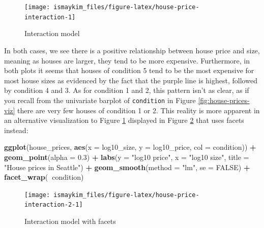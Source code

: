 \documentclass[12pt, krantz2,]{krantz}
\makeatletter
\newenvironment{Shaded}{\begin{snugshade}}{\end{snugshade}}
\newcommand{\DataTypeTok}[1]{\textcolor[rgb]{0.27,0.27,0.27}{#1}}
\newcommand{\FloatTok}[1]{\textcolor[rgb]{0.06,0.06,0.06}{#1}}
\newcommand{\KeywordTok}[1]{\textcolor[rgb]{0.27,0.27,0.27}{\textbf{#1}}}
\newcommand{\NormalTok}[1]{#1}
\newcommand{\OperatorTok}[1]{\textcolor[rgb]{0.43,0.43,0.43}{\textbf{#1}}}
\newcommand{\OtherTok}[1]{\textcolor[rgb]{0.37,0.37,0.37}{#1}}
\newcommand{\StringTok}[1]{\textcolor[rgb]{0.5,0.5,0.5}{#1}}
\newenvironment{kframe}{%
\medskip{}
\setlength{\fboxsep}{.8em}
 \def\at@end@of@kframe{}%
 \ifinner\ifhmode%
  \def\at@end@of@kframe{\end{minipage}}%
  \begin{minipage}{\columnwidth}%
 \fi\fi%
 \def\FrameCommand##1{\hskip\@totalleftmargin \hskip-\fboxsep
 \colorbox{shadecolor}{##1}\hskip-\fboxsep
     \hskip-\linewidth \hskip-\@totalleftmargin \hskip\columnwidth}%
 \MakeFramed {\advance\hsize-\width
   \@totalleftmargin\z@ \linewidth\hsize
   \@setminipage}}%
 {\par\unskip\endMakeFramed%
 \at@end@of@kframe}
\renewenvironment{Shaded}{\begin{kframe}}{\end{kframe}}
\makeatother
\begin{document}
\begin{figure}

{\centering \texttt{[image: ismaykim\_files/figure-latex/house-price-interaction-1]} 

}

\caption{Interaction model}\label{fig:house-price-interaction}
\end{figure}

In both cases, we see there is a positive relationship between house price and size, meaning as houses are larger, they tend to be more expensive. Furthermore, in both plots it seems that houses of condition 5 tend to be the most expensive for most house sizes as evidenced by the fact that the purple line is highest, followed by condition 4 and 3. As for condition 1 and 2, this pattern isn't as clear, as if you recall from the univariate barplot of \texttt{condition} in Figure \ref{fig:house-prices-viz} there are very few houses of condition 1 or 2. This reality is more apparent in an alternative visualization to Figure \ref{fig:house-price-interaction} displayed in Figure \ref{fig:house-price-interaction-2} that uses facets instead:

\begin{Shaded}
\begin{Highlighting}[]
\KeywordTok{ggplot}\NormalTok{(house_prices, }\KeywordTok{aes}\NormalTok{(}\DataTypeTok{x =}\NormalTok{ log10_size, }\DataTypeTok{y =}\NormalTok{ log10_price, }\DataTypeTok{col =}\NormalTok{ condition)) }\OperatorTok{+}
\StringTok{  }\KeywordTok{geom_point}\NormalTok{(}\DataTypeTok{alpha =} \FloatTok{0.3}\NormalTok{) }\OperatorTok{+}
\StringTok{  }\KeywordTok{labs}\NormalTok{(}\DataTypeTok{y =} \StringTok{"log10 price"}\NormalTok{, }\DataTypeTok{x =} \StringTok{"log10 size"}\NormalTok{, }\DataTypeTok{title =} \StringTok{"House prices in Seattle"}\NormalTok{) }\OperatorTok{+}
\StringTok{  }\KeywordTok{geom_smooth}\NormalTok{(}\DataTypeTok{method =} \StringTok{"lm"}\NormalTok{, }\DataTypeTok{se =} \OtherTok{FALSE}\NormalTok{) }\OperatorTok{+}
\StringTok{  }\KeywordTok{facet_wrap}\NormalTok{(}\OperatorTok{~}\NormalTok{condition)}
\end{Highlighting}
\end{Shaded}

\begin{figure}

{\centering \texttt{[image: ismaykim\_files/figure-latex/house-price-interaction-2-1]} 

}

\caption{Interaction model with facets}\label{fig:house-price-interaction-2}
\end{figure}
\end{document}
